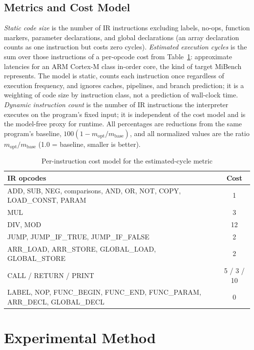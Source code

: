 \documentclass[conference]{IEEEtran}
\begin{document}
\subsection{Metrics and Cost Model}
\label{sec:metrics}
\textit{Static code size} is the number of IR instructions excluding labels, no-ops, function markers, parameter declarations, and global declarations (an array declaration counts as one instruction but costs zero cycles). \textit{Estimated execution cycles} is the sum over those instructions of a per-opcode cost from Table~\ref{tab:cost_model}: approximate latencies for an ARM Cortex-M class in-order core, the kind of target MiBench represents. The model is static, counts each instruction once regardless of execution frequency, and ignores caches, pipelines, and branch prediction; it is a weighting of code size by instruction class, not a prediction of wall-clock time. \textit{Dynamic instruction count} is the number of IR instructions the interpreter executes on the program's fixed input; it is independent of the cost model and is the model-free proxy for runtime. All percentages are reductions from the same program's baseline, $100 (1 - m_{\mathrm{opt}}/m_{\mathrm{base}})$, and all normalized values are the ratio $m_{\mathrm{opt}}/m_{\mathrm{base}}$ (1.0 = baseline, smaller is better).

\begin{table}[!htbp]
\centering
\caption{Per-instruction cost model for the estimated-cycle metric}
\label{tab:cost_model}
\renewcommand{\arraystretch}{1.05}
{\footnotesize
\begin{tabularx}{\columnwidth}{@{}>{\raggedright\arraybackslash}Xc@{}}
\toprule
\textbf{IR opcodes} & \textbf{Cost} \\
\midrule
ADD, SUB, NEG, comparisons, AND, OR, NOT, COPY, LOAD\_CONST, PARAM & 1 \\
MUL & 3 \\
DIV, MOD & 12 \\
JUMP, JUMP\_IF\_TRUE, JUMP\_IF\_FALSE & 2 \\
ARR\_LOAD, ARR\_STORE, GLOBAL\_LOAD, GLOBAL\_STORE & 2 \\
CALL / RETURN / PRINT & 5 / 3 / 10 \\
LABEL, NOP, FUNC\_BEGIN, FUNC\_END, FUNC\_PARAM, ARR\_DECL, GLOBAL\_DECL & 0 \\
\bottomrule
\end{tabularx}
}
\end{table}

\section{Experimental Method}
\label{sec:setup}
\end{document}
